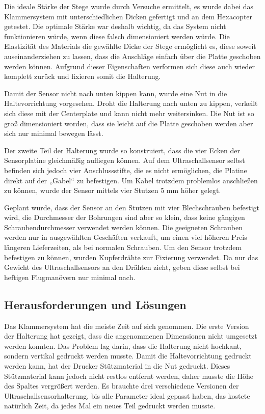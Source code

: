 			\newpage

	Die ideale Stärke der Stege wurde durch Versuche ermittelt, es wurde dabei das Klammersystem mit unterschiedlichen Dicken gefertigt und an dem Hexacopter getestet.
	Die optimale Stärke war deshalb wichtig, da das System nicht funktionieren würde, wenn diese falsch dimensioniert werden würde.
	Die Elastizität des Materials \bzw die gewählte Dicke der Stege ermöglicht es, diese soweit auseinanderziehen zu lassen, dass die Anschläge einfach über die Platte geschoben werden können.
	Aufgrund dieser Eigenschaften verformen sich diese auch wieder komplett zurück und fixieren somit die Halterung.

	Damit der Sensor nicht nach unten kippen kann, wurde eine Nut in die Haltevorrichtung vorgesehen.
	Droht die Halterung nach unten zu kippen, verkeilt sich diese mit der Centerplate und kann nicht mehr weitersinken.
	Die Nut ist so groß dimensioniert worden, dass sie leicht auf die Platte geschoben werden aber sich nur minimal bewegen lässt.

	Der zweite Teil der Halterung wurde so konstruiert, dass die vier Ecken der Sensorplatine gleichmäßig aufliegen können.
	Auf dem Ultraschallsensor selbst befinden sich jedoch vier Anschlussstifte, die es nicht ermöglichen, die Platine direkt auf der „Gabel“ zu befestigen.
	Um Kabel trotzdem problemlos anschließen zu können, wurde der Sensor mittels vier Stutzen 5 mm höher gelegt.

	Geplant wurde, dass der Sensor an den Stutzen mit vier Blechschrauben befestigt wird, die Durchmesser der Bohrungen sind aber so klein, dass keine gängigen Schraubendurchmesser verwendet werden können.
	Die geeigneten Schrauben werden nur in ausgewählten Geschäften verkauft, um einen viel höheren Preis \bzw längeren Lieferzeiten, als bei normalen Schrauben.
	Um den Sensor trotzdem befestigen zu können, wurden Kupferdrähte zur Fixierung verwendet.
	Da nur das Gewicht des Ultraschallsensors an den Drähten zieht, geben diese selbst bei heftigen Flugmanövern nur minimal nach.

	\subsection{Herausforderungen und Lösungen}

	Das Klammersystem hat die meiste Zeit auf sich genommen.
	Die erste Version der Halterung hat gezeigt, dass die angenommenen Dimensionen nicht umgesetzt werden konnten.
	Das Problem lag darin, dass die Halterung nicht hochkant, sondern vertikal gedruckt werden musste.
	Damit die Haltevorrichtung gedruckt werden kann, hat der Drucker Stützmaterial in die Nut gedruckt.
	Dieses Stützmaterial kann jedoch nicht restlos entfernt werden, daher musste die Höhe des Spaltes vergrößert werden.
	Es brauchte drei verschiedene Versionen der Ultraschallsensorhalterung, bis alle Parameter ideal gepasst haben, das kostete natürlich Zeit, da jedes Mal ein neues Teil gedruckt werden musste.


